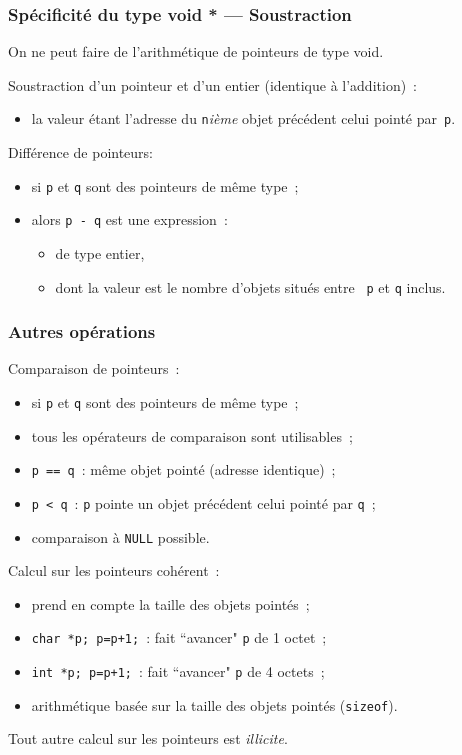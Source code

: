 \begin{frame}
  \frametitle{Sp\'ecificit\'e du type void * --- Soustraction}
  On ne peut faire de l'arithm\'etique de pointeurs de type void.
  \par\bigskip
 Soustraction d'un pointeur et d'un entier (identique \`a l'addition)~:
\begin{itemize}
\item la valeur \'etant l'adresse du {\tt n}{\it i\`eme} objet
  pr\'ec\'edent celui point\'e par~{\tt p}.
\end{itemize}
\par\bigskip
 Diff\'erence de pointeurs:
\begin{itemize}
\item si {\tt p} et {\tt q} sont des pointeurs de m\^eme type~;
  \item alors {\tt p - q} est une expression~:
    \begin{itemize}
    \item  de type entier,
      \item dont la valeur est le nombre d'objets situ\'es entre {\tt
          p} et {\tt q} inclus.
    \end{itemize}
\end{itemize}
\end{frame}
\begin{frame}[fragile]
  \frametitle{Autres op\'erations}
 Comparaison de pointeurs~:
\begin{itemize}
  \item si {\tt p} et {\tt q} sont des  pointeurs de m\^eme type~;
  \item tous les op\'erateurs de comparaison sont utilisables~;
  \item {\tt p == q}~: m\^eme objet point\'e (adresse identique)~;
  \item \verb?p < q?~: {\tt p} pointe un objet pr\'ec\'edent celui
    point\'e par {\tt q}~;
  \item comparaison \`a {\tt NULL} possible.
\end{itemize}
 Calcul sur les pointeurs coh\'erent~:
\begin{itemize}
  \item prend en compte la taille des objets point\'es~;
  \item {\tt char *p; p=p+1;}~: fait ``avancer" {\tt p} de 1 octet~;
  \item {\tt int *p; p=p+1;}~: fait ``avancer" {\tt p} de 4 octets~;
  \item arithm\'etique bas\'ee sur la taille des objets point\'es ({\tt sizeof}).
\end{itemize}
 Tout autre calcul sur les pointeurs est {\em illicite}.

\end{frame}

